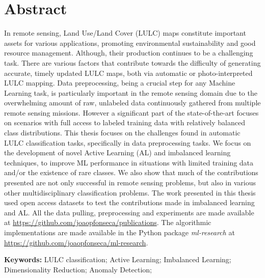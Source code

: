 \chapter*{Abstract}

\begin{adjustwidth}{30pt}{30pt}

    In remote sensing, Land Use/Land Cover (LULC) maps constitute important
    assets for various applications, promoting environmental sustainability
    and good resource management. Although, their production continues to be a
    challenging task.  There are various factors that contribute towards the
    difficulty of generating accurate, timely updated LULC maps, both via
    automatic or photo-interpreted LULC mapping. Data preprocessing, being a
    crucial step for any Machine Learning task, is particularly important in
    the remote sensing domain due to the overwhelming amount of raw, unlabeled
    data continuously gathered from multiple remote sensing missions. However
    a significant part of the state-of-the-art focuses on scenarios with full
    access to labeled training data with relatively balanced class
    distributions. This thesis focuses on the challenges found in automatic
    LULC classification tasks, specifically in data preprocessing tasks.  We
    focus on the development of novel Active Learning (AL) and imbalanced
    learning techniques, to improve ML performance in situations with limited
    training data and/or the existence of rare classes. We also show that much
    of the contributions presented are not only successful in remote sensing
    problems, but also in various other multidisciplinary classification
    problems. The work presented in this thesis used open access datasets to
    test the contributions made in imbalanced learning and AL. All the data
    pulling, preprocessing and experiments are made available at
    \href{https://github.com/joaopfonseca/publications}{https://github.com/joaopfonseca/publications}.
    The algorithmic implementations are made available in the Python package
    \textit{ml-research} at
    \href{https://github.com/joaopfonseca/ml-research}{https://github.com/joaopfonseca/ml-research}.

\end{adjustwidth}

\vspace{.5cm}
\textbf{Keywords:} LULC classification; Active Learning;
Imbalanced Learning; Dimensionality Reduction; Anomaly Detection; 
